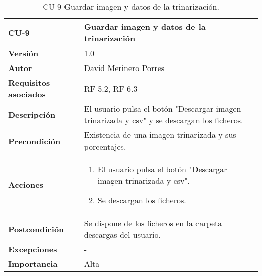 \begin{table}[p]
	\centering
	\begin{tabularx}{\linewidth}{ p{} p{} }
		\toprule
		\textbf{CU-9}    & \textbf{Guardar imagen y datos de la trinarización}\\
		\toprule
		\textbf{Versión}              & 1.0    \\
		\textbf{Autor}                & David Merinero Porres \\
		\textbf{Requisitos asociados} & RF-5.2, RF-6.3 \\
		\textbf{Descripción}          & El usuario pulsa el botón "Descargar imagen trinarizada y csv" y se descargan los ficheros. \\
		\textbf{Precondición}         & Existencia  de una imagen trinarizada y sus porcentajes. \\
		\textbf{Acciones}             &
		\begin{enumerate}
			\def\labelenumi{\arabic{enumi}.}
			\tightlist
			\item El usuario pulsa el botón "Descargar imagen trinarizada y csv".
                \item Se descargan los ficheros.
		\end{enumerate}\\
		\textbf{Postcondición}        & Se dispone de los ficheros en la carpeta descargas del usuario. \\
		\textbf{Excepciones}          & - \\
		\textbf{Importancia}          & Alta \\
		\bottomrule
	\end{tabularx}
	\caption{CU-9 Guardar imagen y datos de la trinarización.}
\end{table}

